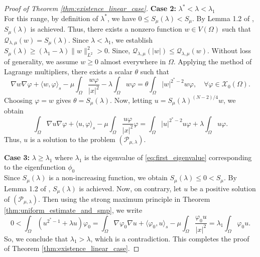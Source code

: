\documentclass[11pt]{article}
\newcommand{\la} {\lambda}
\newcommand{\noi} {\noindent}
\newcommand{\X}{\mathcal{X}_0} %
\newcommand{\Q}{\mathcal{Q}_{\la,\mu}}
\begin{document}
\begin{proof}[Proof of Theorem \ref{thm:existence_linear_case}]
\noi \textbf{Case 2:} $\lambda^* < \lambda < \lambda_1$ \\
For this range, by definition of $\la^*$, we have $0 \leq S_{\mu}(\lambda) < S_{\mu}$. By Lemma 1.2 of \cite{brezis_1983}, $S_{\mu}(\la)$ is achieved. Thus, there exists a nonzero function $w \in V(\Omega)$ such that $\Q(w) = S_{\mu}(\lambda)$. Since $\lambda < \lambda_1$, we establish $S_{\mu}(\lambda)  \geq (\lambda_1 - \lambda) \| w \|_{L^2}^2 > 0$. Since, $\Q(|w|) \leq  \Q(w)$. Without loss of generality, we assume $w \geq 0$ almost everywhere in $\Omega$.
Applying the method of Lagrange multipliers, there exists a scalar $\theta$ such that
\begin{equation*}
\nabla w  \nabla \varphi + \langle w, \varphi \rangle_{s} - \mu \int_{\Omega} \frac{w \varphi}{|x|^2}  - \lambda \int_{\Omega} w \varphi = \theta \int_{\Omega} |w|^{2^*-2}w \varphi, \quad \forall \varphi \in \X(\Omega).
\end{equation*}
Choosing $\varphi = w$ gives $\theta = S_{\mu}(\lambda)$.
Now, letting $u = S_{\mu}(\lambda)^{(N-2)/4}w$, we obtain
\begin{equation*}
\int_{\Omega} \nabla u \nabla \varphi + \langle u, \varphi \rangle_{s} - \mu \int_{\Omega} \frac{u \varphi}{|x|^2} \varphi = \int_{\Omega} |u|^{2^*-2} u \varphi + \lambda \int_{\Omega} u \varphi.
\end{equation*}
Thus, $u$ is a solution to the problem $( \mathcal{P}_{\mu,\la})$.


\noi \textbf{Case 3:} $\lambda \geq \lambda_1$ where $\la_1$ is the eigenvalue of \eqref{eq:first_eigenvalue} corresponding to the eigenfunction $\phi_0$\\
Since $S_{\mu}(\lambda)$ is a non-increasing function, we obtain $S_{\mu}(\lambda) \leq 0 < S_{\mu}$. By Lemma 1.2 of \cite{brezis_1983}, $S_{\mu}(\lambda)$ is achieved.
Now, on contrary, let $u$ be a positive solution of $(\mathcal{P}_{\mu,\la})$. 
Then using the strong maximum principle in Theorem \ref{thm:uniform_estimate_and_smp}, we write
\begin{equation*}
0 < \int_{\Omega} (u^{2^*-1} + \lambda u) \varphi_0 = \int_{\Omega} \nabla \varphi_0   \nabla u + \langle \varphi_0, u \rangle_s - \mu \int_{\Omega} \frac{\varphi_0 u}{|x|^2} =  \lambda_1 \int_{\Omega} \varphi_0 u.
\end{equation*}
So, we conclude that $\lambda_1 > \lambda$, which is a contradiction.
This completes the proof of Theorem \eqref{thm:existence_linear_case}.
\end{proof}
\end{document}
